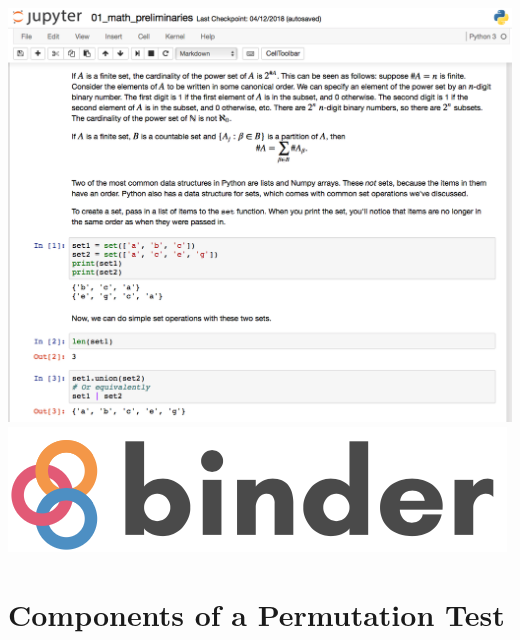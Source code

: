\documentclass{beamer}
\begin{document}
{\includegraphics[height=\paperheight]{fig/jupyter_notebook.png}
\includegraphics{fig/binder.png}
}


\section[Components of a Permutation Test]{Components of a Permutation Test}

\end{document}
